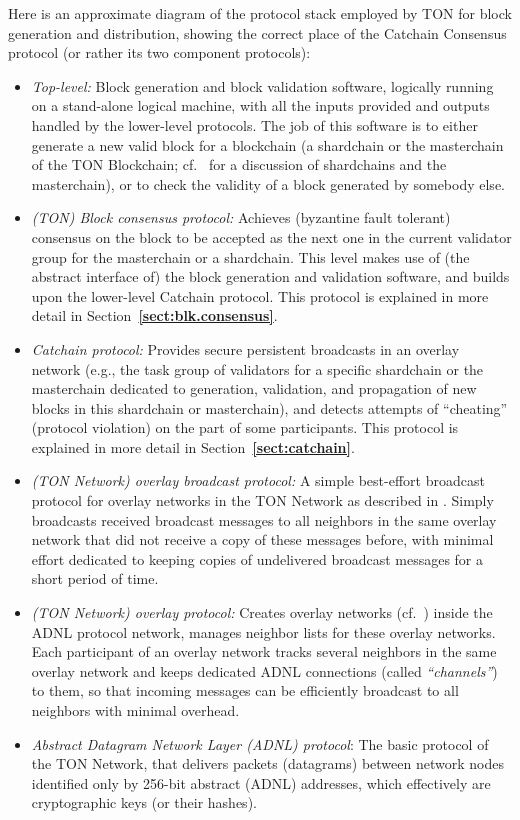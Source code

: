 \documentclass[12pt,oneside]{article}
\def\refpoint#1{{\rm\textbf{\ref{#1}}}}
\let\ptref=\refpoint
\begin{document}
Here is an approximate diagram of the protocol stack employed by TON for block generation and distribution, showing the correct place of the Catchain Consensus protocol (or rather its two component protocols):
\begin{itemize}
\item {\it Top-level:} Block generation and block validation software, logically running on a stand-alone logical machine, with all the inputs provided and outputs handled by the lower-level protocols. The job of this software is to either generate a new valid block for a blockchain (a shardchain or the masterchain of the TON Blockchain; cf.~\cite{TON} for a discussion of shardchains and the masterchain), or to check the validity of a block generated by somebody else.
\item {\it (TON) Block consensus protocol:\/} Achieves (byzantine fault tolerant) consensus on the block to be accepted as the next one in the current validator group for the masterchain or a shardchain. This level makes use of (the abstract interface of) the block generation and validation software, and builds upon the lower-level Catchain protocol. This protocol is explained in more detail in Section~\ptref{sect:blk.consensus}.
\item {\it Catchain protocol:\/} Provides secure persistent broadcasts in an overlay network (e.g., the task group of validators for a specific shardchain or the masterchain dedicated to generation, validation, and propagation of new blocks in this shardchain or masterchain), and detects attempts of ``cheating'' (protocol violation) on the part of some participants. This protocol is explained in more detail in Section~\ptref{sect:catchain}.
\item {\it (TON Network) overlay broadcast protocol:\/} A simple best-effort broadcast protocol for overlay networks in the TON Network as described in \cite{TON}. Simply broadcasts received broadcast messages to all neighbors in the same overlay network that did not receive a copy of these messages before, with minimal effort dedicated to keeping copies of undelivered broadcast messages for a short period of time.
\item {\it (TON Network) overlay protocol:\/} Creates overlay networks (cf.~\cite{TON}) inside the ADNL protocol network, manages neighbor lists for these overlay networks. Each participant of an overlay network tracks several neighbors in the same overlay network and keeps dedicated ADNL connections (called {\em ``channels''\/}) to them, so that incoming messages can be efficiently broadcast to all neighbors with minimal overhead.
\item {\it Abstract Datagram Network Layer (ADNL) protocol\/}: The basic protocol of the TON Network, that delivers packets (datagrams) between network nodes identified only by 256-bit abstract (ADNL) addresses, which effectively are cryptographic keys (or their hashes).
\end{itemize}
\end{document}
